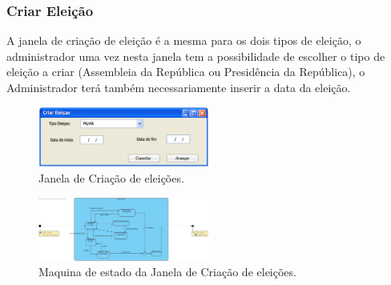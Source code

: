\documentclass[a4paper,12pt]{report}
\begin{document}
\subsubsection{Criar Eleição}
A janela de criação de eleição é a mesma para os dois tipos de eleição, o administrador uma vez nesta janela tem a possibilidade de escolher o tipo de eleição a criar (Assembleia da República ou Presidência da República), o Administrador terá também necessariamente inserir a data da eleição.
\begin{figure}[h]
\begin{center}
	\includegraphics[width=0.5\textwidth]{media/mockup/CriarEleicao.png}
	 \caption{Janela de Criação de eleições.}
\end{center}
\end{figure}
\begin{figure}[h]
\begin{center}
	\includegraphics[width=0.5\textwidth]{media/MaqEst/m_CriarEleicao.jpg}
	 \caption{Maquina de estado da Janela de Criação de eleições.}
\end{center}
\end{figure}
\end{document}
